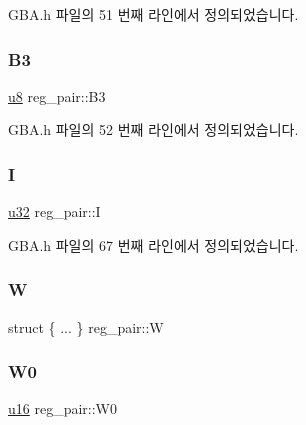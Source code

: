 G\+B\+A.\+h 파일의 51 번째 라인에서 정의되었습니다.

\mbox{\label{unionreg__pair_a5860111dd570e02024b8b091b827e1e5}} 
\subsubsection{\texorpdfstring{B3}{B3}}
{\footnotesize\ttfamily \mbox{\hyperlink{_system_8h_aed742c436da53c1080638ce6ef7d13de}{u8}} reg\+\_\+pair\+::\+B3}



G\+B\+A.\+h 파일의 52 번째 라인에서 정의되었습니다.

\mbox{\label{unionreg__pair_a9f6a42d56c07829d7013571eda998252}} 
\subsubsection{\texorpdfstring{I}{I}}
{\footnotesize\ttfamily \mbox{\hyperlink{_system_8h_a10e94b422ef0c20dcdec20d31a1f5049}{u32}} reg\+\_\+pair\+::I}



G\+B\+A.\+h 파일의 67 번째 라인에서 정의되었습니다.

\mbox{\label{unionreg__pair_aaa63aa528e9ef659bfefa9ae70aa05b0}} 
\subsubsection{\texorpdfstring{W}{W}}
{\footnotesize\ttfamily struct \{ ... \}   reg\+\_\+pair\+::W}

\mbox{\label{unionreg__pair_abc166c5e9cdf387119821685a96bcc30}} 
\subsubsection{\texorpdfstring{W0}{W0}}
{\footnotesize\ttfamily \mbox{\hyperlink{_system_8h_a9e6c91d77e24643b888dbd1a1a590054}{u16}} reg\+\_\+pair\+::\+W0}



